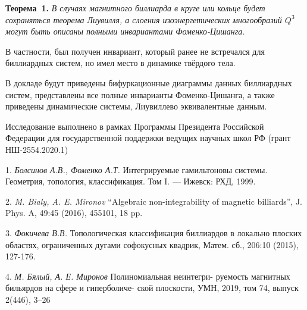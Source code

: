	\textbf{Теорема~1.} {\it В случаях магнитного биллиарда в круге или кольце будет сохраняться теорема Лиувилля, а слоения изоэнергетических многообразий $Q^3$ могут быть описаны полными инвариантами Фоменко-Цишанга.}

	В частности, был получен инвариант, который ранее не встречался для биллиардных систем, но имел место в динамике твёрдого тела.

	В докладе будут приведены бифуркационные диаграммы данных биллиардных систем, представлены все полные инварианты Фоменко-Цишанга, а также приведены динамические системы, Лиувиллево эквивалентные данным.

	Исследование выполнено в рамках Программы Президента Российской Федерации для государственной поддержки ведущих научных школ РФ (грант НШ-2554.2020.1)

\litlist

	1. {\it Болсинов А.В., Фоменко А.Т.} Интегрируемые гамильтоновы системы. Геометрия, топология, классификация. Том I.
	--- Ижевск: РХД, 1999.

	2. {\it M. Bialy, A. E. Mironov} “Algebraic non-integrability of magnetic billiards”,
	J. Phys. A, 49:45 (2016), 455101, 18 pp.

	3. {\it Фокичева В.В.} Топологическая классификация биллиардов в локально плоских областях, ограниченных дугами софокусных квадрик, Матем. сб., 206:10 (2015), 127-176.

	4. {\it М. Бялый, А. Е. Миронов} Полиномиальная неинтегри-
	руемость магнитных бильярдов на сфере и гиперболиче-
	ской плоскости, УМН, 2019, том 74, выпуск 2(446), 3–26
